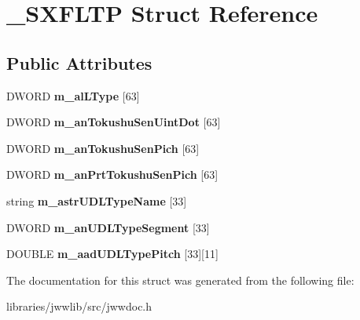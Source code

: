 \hypertarget{struct__SXFLTP}{\section{\-\_\-\-S\-X\-F\-L\-T\-P Struct Reference}
\label{struct__SXFLTP}
}
\subsection*{Public Attributes}
\begin{DoxyCompactItemize}
\item 
\hypertarget{struct__SXFLTP_a451961009e05fe10f35beaa2d2adcaf4}{D\-W\-O\-R\-D {\bfseries m\-\_\-al\-L\-Type} \mbox{[}63\mbox{]}}\label{struct__SXFLTP_a451961009e05fe10f35beaa2d2adcaf4}

\item 
\hypertarget{struct__SXFLTP_af5c6172b855998800094b67893c20601}{D\-W\-O\-R\-D {\bfseries m\-\_\-an\-Tokushu\-Sen\-Uint\-Dot} \mbox{[}63\mbox{]}}\label{struct__SXFLTP_af5c6172b855998800094b67893c20601}

\item 
\hypertarget{struct__SXFLTP_afcf3bb6a5f3c054c418b8041cc4e845e}{D\-W\-O\-R\-D {\bfseries m\-\_\-an\-Tokushu\-Sen\-Pich} \mbox{[}63\mbox{]}}\label{struct__SXFLTP_afcf3bb6a5f3c054c418b8041cc4e845e}

\item 
\hypertarget{struct__SXFLTP_aef028c395f837d97d51b4f030534f949}{D\-W\-O\-R\-D {\bfseries m\-\_\-an\-Prt\-Tokushu\-Sen\-Pich} \mbox{[}63\mbox{]}}\label{struct__SXFLTP_aef028c395f837d97d51b4f030534f949}

\item 
\hypertarget{struct__SXFLTP_ae98d16fdd9e4bad6a2f6ad93752df3be}{string {\bfseries m\-\_\-astr\-U\-D\-L\-Type\-Name} \mbox{[}33\mbox{]}}\label{struct__SXFLTP_ae98d16fdd9e4bad6a2f6ad93752df3be}

\item 
\hypertarget{struct__SXFLTP_adb66cc672aa181049f4897467bd35311}{D\-W\-O\-R\-D {\bfseries m\-\_\-an\-U\-D\-L\-Type\-Segment} \mbox{[}33\mbox{]}}\label{struct__SXFLTP_adb66cc672aa181049f4897467bd35311}

\item 
\hypertarget{struct__SXFLTP_a70d577a352650f4a930f5e87963c6321}{D\-O\-U\-B\-L\-E {\bfseries m\-\_\-aad\-U\-D\-L\-Type\-Pitch} \mbox{[}33\mbox{]}\mbox{[}11\mbox{]}}\label{struct__SXFLTP_a70d577a352650f4a930f5e87963c6321}

\end{DoxyCompactItemize}


The documentation for this struct was generated from the following file\-:\begin{DoxyCompactItemize}
\item 
libraries/jwwlib/src/jwwdoc.\-h\end{DoxyCompactItemize}
